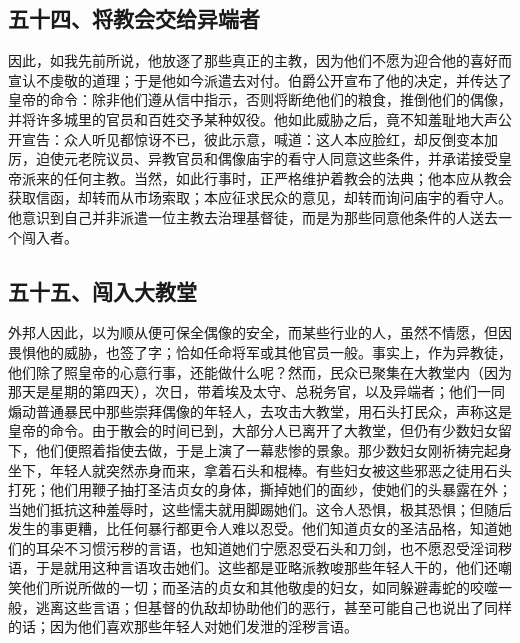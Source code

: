 
\subsection{五十四、将教会交给异端者}

因此，如我先前所说，他放逐了那些真正的主教，因为他们不愿为迎合他的喜好而宣认不虔敬的道理；于是他如今派遣去对付。伯爵公开宣布了他的决定，并传达了皇帝的命令：除非他们遵从信中指示，否则将断绝他们的粮食，推倒他们的偶像，并将许多城里的官员和百姓交予某种奴役。他如此威胁之后，竟不知羞耻地大声公开宣告：众人听见都惊讶不已，彼此示意，喊道：这人本应脸红，却反倒变本加厉，迫使元老院议员、异教官员和偶像庙宇的看守人同意这些条件，并承诺接受皇帝派来的任何主教。当然，如此行事时，正严格维护着教会的法典；他本应从教会获取信函，却转而从市场索取；本应征求民众的意见，却转而询问庙宇的看守人。他意识到自己并非派遣一位主教去治理基督徒，而是为那些同意他条件的人送去一个闯入者。\par


\subsection{五十五、闯入大教堂}

外邦人因此，以为顺从便可保全偶像的安全，而某些行业的人，虽然不情愿，但因畏惧他的威胁，也签了字；恰如任命将军或其他官员一般。事实上，作为异教徒，他们除了照皇帝的心意行事，还能做什么呢？然而，民众已聚集在大教堂内（因为那天是星期的第四天），次日，带着埃及太守、总税务官，以及异端者；他们一同煽动普通暴民中那些崇拜偶像的年轻人，去攻击大教堂，用石头打民众，声称这是皇帝的命令。由于散会的时间已到，大部分人已离开了大教堂，但仍有少数妇女留下，他们便照着指使去做，于是上演了一幕悲惨的景象。那少数妇女刚祈祷完起身坐下，年轻人就突然赤身而来，拿着石头和棍棒。有些妇女被这些邪恶之徒用石头打死；他们用鞭子抽打圣洁贞女的身体，撕掉她们的面纱，使她们的头暴露在外；当她们抵抗这种羞辱时，这些懦夫就用脚踢她们。这令人恐惧，极其恐惧；但随后发生的事更糟，比任何暴行都更令人难以忍受。他们知道贞女的圣洁品格，知道她们的耳朵不习惯污秽的言语，也知道她们宁愿忍受石头和刀剑，也不愿忍受淫词秽语，于是就用这种言语攻击她们。这些都是亚略派教唆那些年轻人干的，他们还嘲笑他们所说所做的一切；而圣洁的贞女和其他敬虔的妇女，如同躲避毒蛇的咬噬一般，逃离这些言语；但基督的仇敌却协助他们的恶行，甚至可能自己也说出了同样的话；因为他们喜欢那些年轻人对她们发泄的淫秽言语。\par

